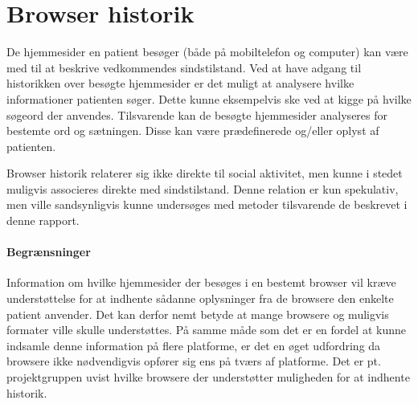 \section{Browser historik}
De hjemmesider en patient besøger (både på mobiltelefon og computer) kan være med til at beskrive vedkommendes sindstilstand.
Ved at have adgang til historikken over besøgte hjemmesider er det muligt at analysere hvilke informationer patienten søger.
Dette kunne eksempelvis ske ved at kigge på hvilke søgeord der anvendes.
Tilsvarende kan de besøgte hjemmesider analyseres for bestemte ord og sætningen.
Disse kan være prædefinerede og/eller oplyst af patienten.

Browser historik relaterer sig ikke direkte til social aktivitet, men kunne i stedet muligvis associeres direkte med sindstilstand.
Denne relation er kun spekulativ, men ville sandsynligvis kunne undersøges med metoder tilsvarende de beskrevet i denne rapport.

\paragraph{Begrænsninger}
Information om hvilke hjemmesider der besøges i en bestemt browser vil kræve understøttelse for at indhente sådanne oplysninger fra de browsere den enkelte patient anvender.
Det kan derfor nemt betyde at mange browsere og muligvis formater ville skulle understøttes.
På samme måde som det er en fordel at kunne indsamle denne information på flere platforme, er det en øget udfordring da browsere ikke nødvendigvis opfører sig ens på tværs af platforme.
Det er pt. projektgruppen uvist hvilke browsere der understøtter muligheden for at indhente historik.